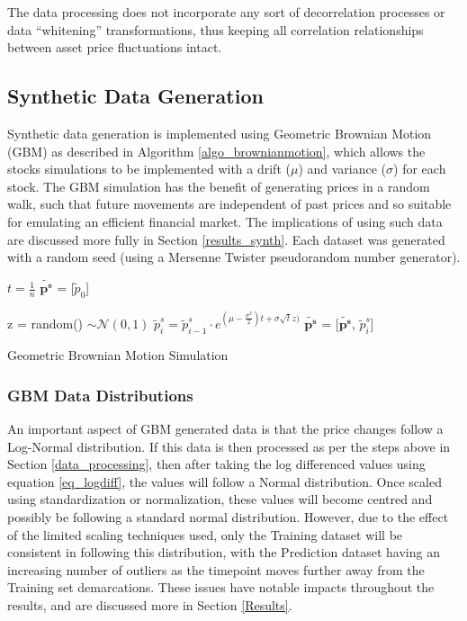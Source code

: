 \documentclass[a4paper,11pt,oneside]{article}
\theoremstyle{plain}
\theoremstyle{definition}
\begin{document}
	The data processing does not incorporate any sort of decorrelation processes or data ``whitening'' transformations, thus keeping all correlation relationships between asset price fluctuations intact.
	
	\subsection{Synthetic Data Generation}\label{data_synthetic}
	
	Synthetic data generation is implemented using Geometric Brownian Motion (GBM) as described in Algorithm \ref{algo_brownianmotion}, which allows the stocks simulations to be implemented with a drift ($\mu$) and variance ($\sigma$) for each stock. The GBM simulation has the benefit of generating prices in a random walk, such that future movements are independent of past prices and so suitable for emulating an efficient financial market. The implications of using such data are discussed more fully in Section \ref{results_synth}. Each dataset was generated with a random seed (using a Mersenne Twister pseudorandom number generator). \newline
	
	\begin{algorithm}[H]
		
		$t = \frac{1}{n}$\;
		$\mathbf{\tilde{p^s}}$ = [$\tilde{p}_0$]\;
		
		{
			z = random()  $\sim \mathcal{N}(0,1)$\;
			$\tilde{p}^s_i = \tilde{p}^s_{i-1} \cdot e^{(\mu - \frac {\sigma^2}{2})t + \sigma  \sqrt{t}  z)}$\;
			$\mathbf{\tilde{p^s}}$ = [$\mathbf{\tilde{p^s}}$, $\tilde{p}^s_i$]\;
		}
		\label{algo_brownianmotion}
		\caption{Geometric Brownian Motion Simulation}
	\end{algorithm}
	
	\subsubsection{GBM Data Distributions}
	
	An important aspect of GBM generated data is that the price changes follow a Log-Normal distribution. If this data is then processed as per the steps above in Section \ref{data_processing}, then after taking the log differenced values using equation \eqref{eq_logdiff}, the values will follow a Normal distribution. Once scaled using standardization or normalization, these values will become centred and possibly be following a standard normal distribution. However, due to the effect of the limited scaling techniques used, only the Training dataset will be consistent in following this distribution, with the Prediction dataset having an increasing number of outliers as the timepoint moves further away from the Training set demarcations. These issues have notable impacts throughout the results, and are discussed more in Section \ref{Results}.
	
\end{document}
